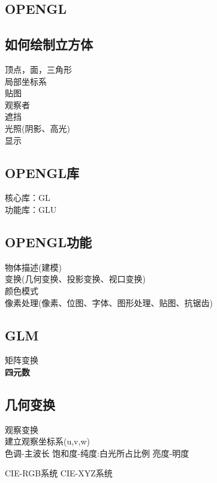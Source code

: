 \documentclass{article}
\begin{document}
\begin{CJK}{UTF8}{gbsn}
	\section{OPENGL}
	\subsection{如何绘制立方体}
	顶点，面，三角形\\
	局部坐标系\\
	贴图\\
	观察者\\
	遮挡\\
	光照(阴影、高光)\\
	显示\\
	\subsection{OPENGL库}
	核心库：GL\\
	功能库：GLU\\
	\subsection{OPENGL功能}
	物体描述(建模)\\
	变换(几何变换、投影变换、视口变换)\\
	颜色模式\\
	像素处理(像素、位图、字体、图形处理、贴图、抗锯齿)\\
	\subsection{GLM}
	矩阵变换\\
	\textbf{四元数}\\
	\subsection{几何变换}
	观察变换\\
	建立观察坐标系(u,v,w)\\
	
	
	色调-主波长
	饱和度-纯度:白光所占比例
	亮度-明度	
	
	CIE-RGB系统
	CIE-XYZ系统
\end{CJK}
\end{document}
